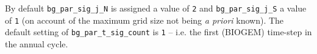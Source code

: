 By default \texttt{bg\_par\_sig\_j\_N} is assigned a value of \texttt{2} and \texttt{bg\_par\_sig\_j\_S} a value of \texttt{1} (on account of the maximum grid size not being \textit{a priori} known).
The default setting of \texttt{bg\_par\_t\_sig\_count} is \texttt{1} -- i.e. the first (BIOGEM) time-step in the annual cycle.

